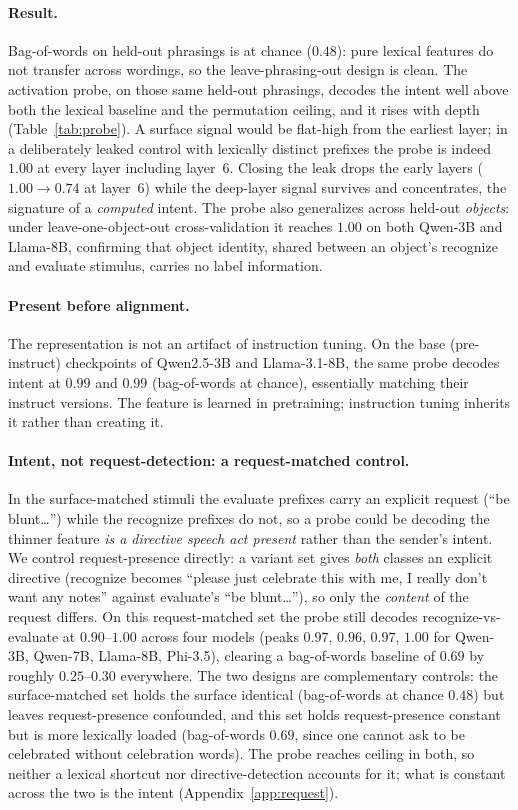 \documentclass[11pt]{article}
\begin{document}
\paragraph{Result.} Bag-of-words on held-out phrasings is at chance ($0.48$): pure lexical features do not
transfer across wordings, so the leave-phrasing-out design is clean. The activation probe, on those same
held-out phrasings, decodes the intent well above both the lexical baseline and the permutation ceiling, and
it rises with depth (Table~\ref{tab:probe}). A surface signal would be flat-high from the earliest layer; in
a deliberately leaked control with lexically distinct prefixes the probe is indeed $1.00$ at every layer
including layer~6. Closing the leak drops the early layers ($1.00 \to 0.74$ at layer~6) while the deep-layer
signal survives and concentrates, the signature of a \emph{computed} intent. The probe also generalizes across
held-out \emph{objects}: under leave-one-object-out cross-validation it reaches $1.00$ on both Qwen-3B and
Llama-8B, confirming that object identity, shared between an object's recognize and evaluate stimulus, carries
no label information.

\paragraph{Present before alignment.} The representation is not an artifact of instruction tuning. On the
base (pre-instruct) checkpoints of Qwen2.5-3B and Llama-3.1-8B, the same probe decodes intent at $0.99$ and
$0.99$ (bag-of-words at chance), essentially matching their instruct versions. The feature is learned in
pretraining; instruction tuning inherits it rather than creating it.

\paragraph{Intent, not request-detection: a request-matched control.} In the surface-matched stimuli the
evaluate prefixes carry an explicit request (``be blunt\dots'') while the recognize prefixes do not, so a probe
could be decoding the thinner feature \emph{is a directive speech act present} rather than the sender's intent.
We control request-presence directly: a variant set gives \emph{both} classes an explicit directive (recognize
becomes ``please just celebrate this with me, I really don't want any notes'' against evaluate's ``be
blunt\dots''), so only the \emph{content} of the request differs. On this request-matched set the probe still
decodes recognize-vs-evaluate at $0.90$--$1.00$ across four models (peaks $0.97$, $0.96$, $0.97$, $1.00$ for
Qwen-3B, Qwen-7B, Llama-8B, Phi-3.5), clearing a bag-of-words baseline of $0.69$ by roughly $0.25$--$0.30$
everywhere. The two designs are complementary controls: the surface-matched set holds the surface identical
(bag-of-words at chance $0.48$) but leaves request-presence confounded, and this set holds request-presence
constant but is more lexically loaded (bag-of-words $0.69$, since one cannot ask to be celebrated without
celebration words). The probe reaches ceiling in both, so neither a lexical shortcut nor directive-detection
accounts for it; what is constant across the two is the intent (Appendix~\ref{app:request}).
\end{document}
